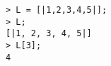 \begin{center}\begin{minipage}{15cm}\begin{Verbatim}[frame=single]
> L = [|1,2,3,4,5|];
> L;
[|1, 2, 3, 4, 5|]
> L[3];
4
\end{Verbatim}
\end{minipage}\end{center}
